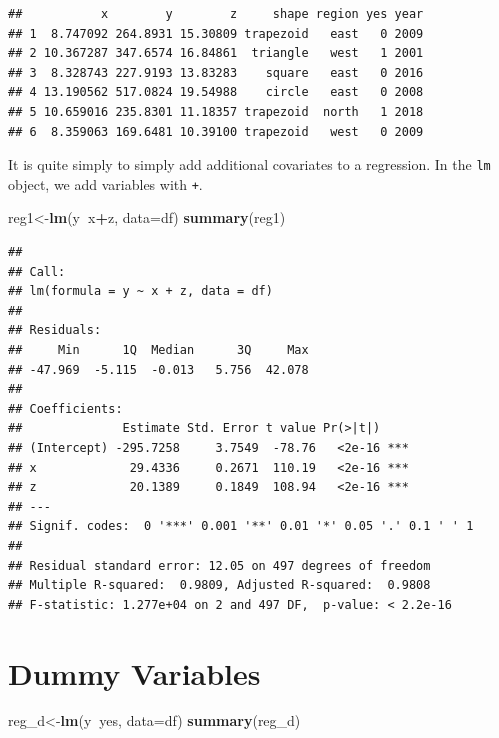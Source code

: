 \documentclass[]{book}
\newenvironment{Shaded}{\begin{snugshade}}{\end{snugshade}}
\newcommand{\KeywordTok}[1]{\textcolor[rgb]{0.13,0.29,0.53}{\textbf{#1}}}
\newcommand{\DataTypeTok}[1]{\textcolor[rgb]{0.13,0.29,0.53}{#1}}
\newcommand{\OperatorTok}[1]{\textcolor[rgb]{0.81,0.36,0.00}{\textbf{#1}}}
\newcommand{\NormalTok}[1]{#1}
\theoremstyle{definition}
\theoremstyle{definition}
\theoremstyle{definition}
\theoremstyle{remark}
\begin{document}
\begin{verbatim}
##           x        y        z     shape region yes year
## 1  8.747092 264.8931 15.30809 trapezoid   east   0 2009
## 2 10.367287 347.6574 16.84861  triangle   west   1 2001
## 3  8.328743 227.9193 13.83283    square   east   0 2016
## 4 13.190562 517.0824 19.54988    circle   east   0 2008
## 5 10.659016 235.8301 11.18357 trapezoid  north   1 2018
## 6  8.359063 169.6481 10.39100 trapezoid   west   0 2009
\end{verbatim}

It is quite simply to simply add additional covariates to a regression.
In the \texttt{lm} object, we add variables with \texttt{+}.

\begin{Shaded}
\begin{Highlighting}[]
\NormalTok{reg1<-}\KeywordTok{lm}\NormalTok{(y}\OperatorTok{~}\NormalTok{x}\OperatorTok{+}\NormalTok{z, }\DataTypeTok{data=}\NormalTok{df)}
\KeywordTok{summary}\NormalTok{(reg1)}
\end{Highlighting}
\end{Shaded}

\begin{verbatim}
## 
## Call:
## lm(formula = y ~ x + z, data = df)
## 
## Residuals:
##     Min      1Q  Median      3Q     Max 
## -47.969  -5.115  -0.013   5.756  42.078 
## 
## Coefficients:
##              Estimate Std. Error t value Pr(>|t|)    
## (Intercept) -295.7258     3.7549  -78.76   <2e-16 ***
## x             29.4336     0.2671  110.19   <2e-16 ***
## z             20.1389     0.1849  108.94   <2e-16 ***
## ---
## Signif. codes:  0 '***' 0.001 '**' 0.01 '*' 0.05 '.' 0.1 ' ' 1
## 
## Residual standard error: 12.05 on 497 degrees of freedom
## Multiple R-squared:  0.9809, Adjusted R-squared:  0.9808 
## F-statistic: 1.277e+04 on 2 and 497 DF,  p-value: < 2.2e-16
\end{verbatim}

\section{Dummy Variables}\label{dummy-variables}

\begin{Shaded}
\begin{Highlighting}[]
\NormalTok{reg_d<-}\KeywordTok{lm}\NormalTok{(y}\OperatorTok{~}\NormalTok{yes, }\DataTypeTok{data=}\NormalTok{df)}
\KeywordTok{summary}\NormalTok{(reg_d)}
\end{Highlighting}
\end{Shaded}
\end{document}
